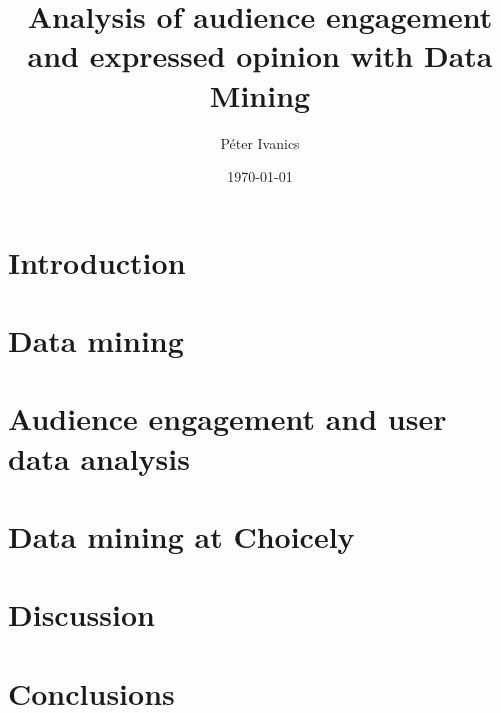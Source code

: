 \documentclass[english]{tktltiki}
\begin{document}
\onehalfspacing

\title{Analysis of audience engagement and expressed opinion with Data Mining}

\author{P\'eter Ivanics}

\date{\today}

\maketitle


\begin{abstract}
\end{abstract}

\mytableofcontents

	\section{Introduction}
	
	
	\section{Data mining}

	\section{Audience engagement and user data analysis}
		
	
	\section{Data mining at Choicely}
	
	
	\section{Discussion}
	

	\section{Conclusions}
	    
\end{document}
